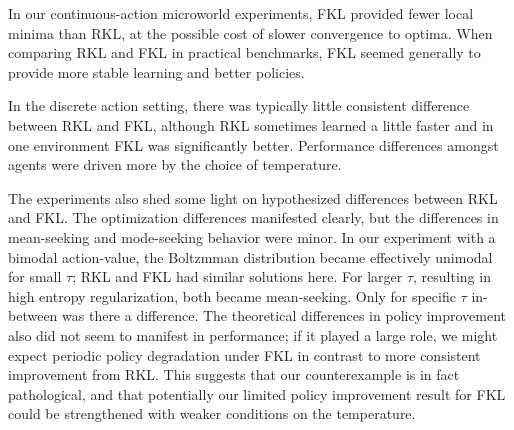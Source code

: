 \documentclass[twoside,11pt]{article}
\begin{document}



In our continuous-action microworld experiments, FKL provided fewer local minima than RKL, at the possible cost of slower convergence to optima. When comparing RKL and FKL in practical benchmarks, FKL seemed generally to provide more stable learning and better policies.

In the discrete action setting, there was typically little consistent difference between RKL and FKL, although RKL sometimes learned a little faster and in one environment FKL was significantly better. Performance differences amongst agents were driven more by the choice of temperature. 

The experiments also shed some light on hypothesized differences between RKL and FKL. The optimization differences manifested clearly, but the differences in mean-seeking and mode-seeking behavior were minor. In our experiment with a bimodal action-value, the Boltzmman distribution became effectively unimodal for small $\tau$; RKL and FKL had similar solutions here. For larger $\tau$, resulting in high entropy regularization, both became mean-seeking. Only for specific $\tau$ in-between was there a difference. The theoretical differences in policy improvement also did not seem to manifest in performance; if it played a large role, we might expect periodic policy degradation under FKL in contrast to more consistent improvement from RKL. This suggests that our counterexample is in fact pathological, and that potentially our limited policy improvement result for FKL could be strengthened with weaker conditions on the temperature.
\end{document}
